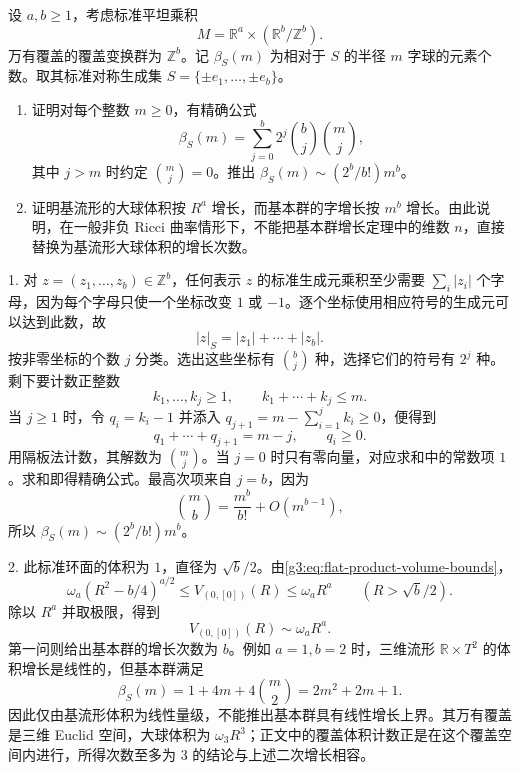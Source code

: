 \begin{exercise}\label{g3:ex:flat-product-group-growth}
	设 \(a,b\ge1\)，考虑标准平坦乘积
	\[
		M=\mathbb R^a\times(\mathbb R^b/\mathbb Z^b).
	\]
	万有覆盖的覆盖变换群为 \(\mathbb Z^b\)。记 \(\beta_S(m)\) 为相对于 \(S\) 的半径 \(m\) 字球的元素个数。取其标准对称生成集
	\(S=\{\pm e_1,\ldots,\pm e_b\}\)。
	\begin{enumerate}
		\item 证明对每个整数 \(m\ge0\)，有精确公式
		\[
			\beta_S(m)=
			\sum_{j=0}^{b}2^j\binom bj\binom mj,
		\]
		其中 \(j>m\) 时约定 \(\binom mj=0\)。推出
		\(\beta_S(m)\sim (2^b/b!)m^b\)。
		\item 证明基流形的大球体积按 \(R^a\) 增长，而基本群的字增长按 \(m^b\) 增长。由此说明，在一般非负 Ricci 曲率情形下，不能把基本群增长定理中的维数 \(n\)，直接替换为基流形大球体积的增长次数。
	\end{enumerate}
\end{exercise}
\begin{solution}
	1. 对 \(z=(z_1,\ldots,z_b)\in\mathbb Z^b\)，任何表示 \(z\) 的标准生成元乘积至少需要 \(\sum_i|z_i|\) 个字母，因为每个字母只使一个坐标改变 \(1\) 或 \(-1\)。逐个坐标使用相应符号的生成元可以达到此数，故
	\[
		|z|_S=|z_1|+\cdots+|z_b|.
	\]
	按非零坐标的个数 \(j\) 分类。选出这些坐标有 \(\binom bj\) 种，选择它们的符号有 \(2^j\) 种。剩下要计数正整数
	\[
		k_1,\ldots,k_j\ge1,\qquad
		k_1+\cdots+k_j\le m.
	\]
	当 \(j\ge1\) 时，令 \(q_i=k_i-1\) 并添入
	\(q_{j+1}=m-\sum_{i=1}^jk_i\ge0\)，便得到
	\[
		q_1+\cdots+q_{j+1}=m-j,\qquad q_i\ge0.
	\]
	用隔板法计数，其解数为 \(\binom mj\)。当 \(j=0\) 时只有零向量，对应求和中的常数项 \(1\)。求和即得精确公式。最高次项来自 \(j=b\)，因为
	\[
		\binom mb=\frac{m^b}{b!}+O(m^{b-1}),
	\]
	所以 \(\beta_S(m)\sim(2^b/b!)m^b\)。

	2. 此标准环面的体积为 \(1\)，直径为 \(\sqrt b/2\)。由\eqref{g3:eq:flat-product-volume-bounds}，
	\[
		\omega_a(R^2-b/4)^{a/2}
		\le V_{(0,[0])}(R)\le\omega_aR^a
		\qquad(R>\sqrt b/2).
	\]
	除以 \(R^a\) 并取极限，得到
	\[
		V_{(0,[0])}(R)\sim\omega_aR^a.
	\]
	第一问则给出基本群的增长次数为 \(b\)。例如 \(a=1,b=2\) 时，三维流形
	\(\mathbb R\times T^2\) 的体积增长是线性的，但基本群满足
	\[
		\beta_S(m)=1+4m+4\binom m2=2m^2+2m+1.
	\]
	因此仅由基流形体积为线性量级，不能推出基本群具有线性增长上界。其万有覆盖是三维 Euclid 空间，大球体积为 \(\omega_3R^3\)；正文中的覆盖体积计数正是在这个覆盖空间内进行，所得次数至多为 \(3\) 的结论与上述二次增长相容。
\end{solution}

